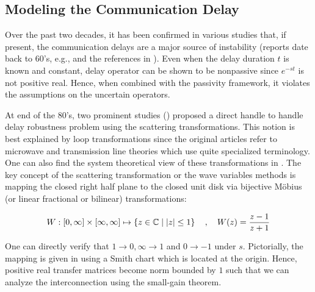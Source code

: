 \subsection{Modeling the Communication Delay}

Over the past two decades, it has been confirmed in various studies that, if present, the communication delays are a major 
source of instability (reports date back to 60's, e.g., \cite{sheridanferrell} and the references in \cite{andersonspong}).
Even when the delay duration $t$ is known and constant, delay operator can be shown to be nonpassive since
$e^{-st}$ is not positive real. Hence, when combined with the passivity framework, it violates the assumptions on the uncertain
operators. 


At end of the 80's, two prominent studies (\cite{andersonspong,nieslotine}) proposed a direct handle to handle delay 
robustness problem using the scattering transformations. This notion is best explained by loop transformations since the 
original articles refer to microwave and transmission line theories which use quite specialized terminology. One can also
find the system theoretical view of these transformations in \cite{colgate3}. The key concept of the scattering transformation
or the wave variables methods is mapping the closed right half plane to the closed unit disk via bijective M\"{o}bius (or linear 
fractional or bilinear) transformations: 
 
\begin{equation}
W:[0,\infty]\times[\infty,\infty] \mapsto \left\{ z\in\mathbb{C} \mid \displaystyle \left|z\right| \leq 1 \right\}\quad, \quad W(z) = \frac{z-1}{z+1}
\label{eq:lit:smith}
\end{equation}

One can directly verify that $1\to 0,\infty\to 1$ and $0\to -1$ under $s$. Pictorially, the mapping is given in 
 using a Smith chart which is located at the origin. Hence, positive real transfer matrices
become norm bounded by $1$ such that we can analyze the interconnection using the small-gain theorem.


